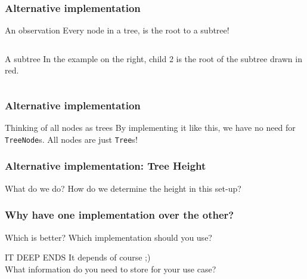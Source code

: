 \begin{frame}
	\frametitle{Alternative implementation}
		\begin{block}{An observation}
			Every node in a tree, is the root to a subtree!
		\end{block}	
		\pause
		\begin{columns}
				
			\pause
				\begin{block}{A subtree}
					In the example on the right, child 2 is the root of the subtree drawn in red.
				\end{block}	
		\end{columns}
\end{frame}

\begin{frame}
	\frametitle{Alternative implementation}
		\begin{block}{Thinking of all nodes as trees}
			By implementing it like this, we have no need for \texttt{TreeNode}s. All nodes are just \texttt{Tree}s!
		\end{block}	

		
\end{frame}

\begin{frame}
	\frametitle{Alternative implementation: Tree Height}
	\begin{block}{What do we do?}
		How do we determine the height in this set-up?
	\end{block}
	\pause
	
\end{frame}

\begin{frame}
	\frametitle{Why have one implementation over the other?}

	\begin{block}{Which is better?}
		Which implementation should you use?
	\end{block}
	\pause
	\begin{block}{IT DEEP ENDS}
		It depends of course ;)\\
		What information do you need to store for your use case?
	\end{block}
	
\end{frame}



